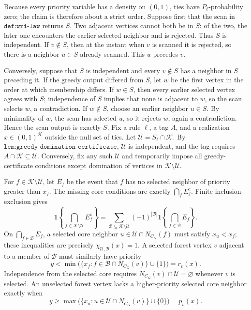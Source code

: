 Because every priority variable has a density on \((0,1)\), ties have \(P_\ell\)-probability zero; the claim is therefore about a strict order.  Suppose first that the scan in \(\texttt{def:wri-law}\) returns \(S\).  Two adjacent vertices cannot both be in \(S\): of the two, the later one encounters the earlier selected neighbor and is rejected.  Thus \(S\) is independent.  If \(v\notin S\), then at the instant when \(v\) is scanned it is rejected, so there is a neighbor \(u\in S\) already scanned.  This \(u\) precedes \(v\).

Conversely, suppose that \(S\) is independent and every \(v\notin S\) has a neighbor in \(S\) preceding it.  If the greedy output differed from \(S\), let \(w\) be the first vertex in the order at which membership differs.  If \(w\in S\), then every earlier selected vertex agrees with \(S\); independence of \(S\) implies that none is adjacent to \(w\), so the scan selects \(w\), a contradiction.  If \(w\notin S\), choose an earlier neighbor \(u\in S\).  By minimality of \(w\), the scan has selected \(u\), so it rejects \(w\), again a contradiction.  Hence the scan output is exactly \(S\).
Fix a rule \(\ell\), a tag \(A\), and a realization \(x\in(0,1)^{\mathcal K}\) outside the null set of ties.  Let \(\mathcal U=S_\ell\cap\mathcal K\).  By \(\texttt{lem:greedy-domination-certificate}\), \(\mathcal U\) is independent, and the tag requires \(A\cap\mathcal K\subseteq\mathcal U\).  Conversely, fix any such \(\mathcal U\) and temporarily impose all greedy-certificate conditions except domination of vertices in \(\mathcal K\setminus\mathcal U\).

For \(f\in\mathcal K\setminus\mathcal U\), let \(E_f\) be the event that \(f\) has no selected neighbor of priority greater than \(x_f\).  The missing core conditions are exactly \(\bigcap_f E_f^{\mathsf c}\).  Finite inclusion--exclusion gives
\[
 \mathbf 1\!\left\{\bigcap_{f\in\mathcal K\setminus\mathcal U}E_f^{\mathsf c}\right\}
 =\sum_{\mathcal B\subseteq\mathcal K\setminus\mathcal U}(-1)^{|\mathcal B|}
   \mathbf 1\!\left\{\bigcap_{f\in\mathcal B}E_f\right\}.
\]
On \(\bigcap_{f\in\mathcal B}E_f\), a selected core neighbor \(u\in\mathcal U\cap N_{C_G}(f)\) must satisfy \(x_u<x_f\); these inequalities are precisely \(\chi_{\mathcal U,\mathcal B}(x)=1\).  A selected forest vertex \(v\) adjacent to a member of \(\mathcal B\) must similarly have priority
\[
 y<\min\bigl(\{x_f:f\in\mathcal B\cap N_{C_G}(v)\}\cup\{1\}\bigr)=r_v(x).
\]
Independence from the selected core requires \(N_{C_G}(v)\cap\mathcal U=\varnothing\) whenever \(v\) is selected.  An unselected forest vertex lacks a higher-priority selected core neighbor exactly when
\[
 y\ge \max\bigl(\{x_u:u\in\mathcal U\cap N_{C_G}(v)\}\cup\{0\}\bigr)=p_v(x).
\]

